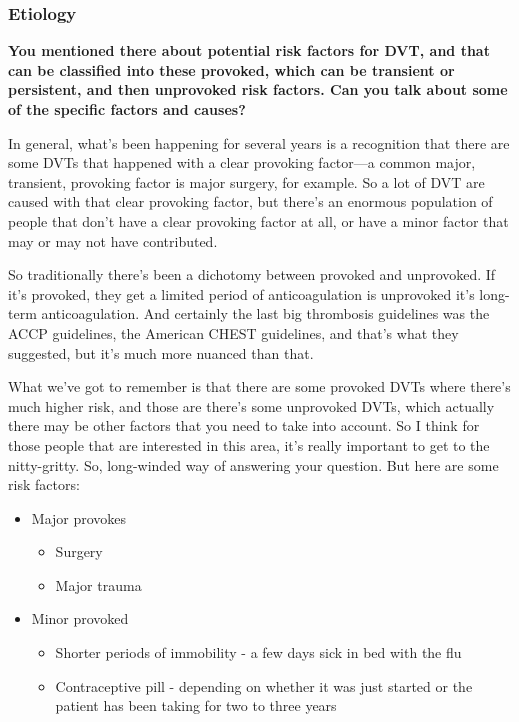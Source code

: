 \documentclass[
]{book}
\begin{document}
\hypertarget{etiology-10}{%
\subsubsection{Etiology}\label{etiology-10}}

\textbf{You mentioned there about potential risk factors for DVT, and that can
be classified into these provoked, which can be transient or persistent,
and then unprovoked risk factors. Can you talk about some of the
specific factors and causes?}

In general, what's been happening for several years is a recognition
that there are some DVTs that happened with a clear provoking factor---a
common major, transient, provoking factor is major surgery, for example.
So a lot of DVT are caused with that clear provoking factor, but there's
an enormous population of people that don't have a clear provoking
factor at all, or have a minor factor that may or may not have
contributed.

So traditionally there's been a dichotomy between provoked and
unprovoked. If it's provoked, they get a limited period of
anticoagulation is unprovoked it's long-term anticoagulation. And
certainly the last big thrombosis guidelines was the ACCP guidelines,
the American CHEST guidelines, and that's what they suggested, but it's
much more nuanced than that.

What we've got to remember is that there are some provoked DVTs where
there's much higher risk, and those are there's some unprovoked DVTs,
which actually there may be other factors that you need to take into
account. So I think for those people that are interested in this area,
it's really important to get to the nitty-gritty. So, long-winded way of
answering your question. But here are some risk factors:

\begin{itemize}
\item
  Major provokes

  \begin{itemize}
  \item
    Surgery
  \item
    Major trauma
  \end{itemize}
\item
  Minor provoked

  \begin{itemize}
  \item
    Shorter periods of immobility - a few days sick in bed with the
    flu
  \item
    Contraceptive pill - depending on whether it was just started or
    the patient has been taking for two to three years
  \end{itemize}
\end{itemize}
\end{document}
